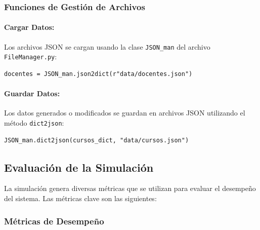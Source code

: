 \documentclass{article}
\begin{document}
\subsubsection{Funciones de Gestión de Archivos}
\paragraph{Cargar Datos:} Los archivos JSON se cargan usando la clase \texttt{JSON\_man} del 
  archivo \texttt{FileManager.py}:

\begin{verbatim}
docentes = JSON_man.json2dict(r"data/docentes.json")
\end{verbatim}

\paragraph{Guardar Datos:} Los datos generados o modificados se guardan en archivos JSON 
utilizando el método \texttt{dict2json}:

\begin{verbatim}
JSON_man.dict2json(cursos_dict, "data/cursos.json")
\end{verbatim}

\subsection{Evaluación de la Simulación}
La simulación genera diversas métricas que se utilizan para evaluar el desempeño 
del sistema. Las métricas clave son las siguientes:

\subsubsection{Métricas de Desempeño}
\end{document}
